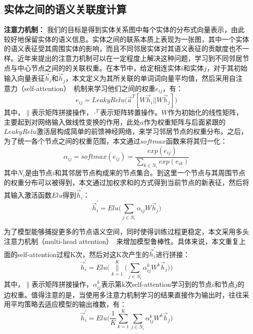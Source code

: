 \subsection{实体之间的语义关联度计算}

\textbf{注意力机制：}
我们的目标是得到实体关系图中每个实体的分布式向量表示，由此较好地保留实体的语义信息。实体之间的联系本质上表现为一张图，其中一个实体的语义表征受其周围实体的影响，而且不同邻居实体对其语义表征的贡献度也不一样。近年来提出的注意力机制可以在一定程度上解决这种问题，学习到不同邻居节点与中心节点之间的的关联权重。在本节中，给定相连实体$i$和实体$j$，对于其初始输入向量表征$\vec h_i$和$\vec h_j$，本文定义为其所关联的单词词向量平均值，然后采用自注意力（self-attention）~\cite{corr/VaswaniSPUJGKP17, iclr/VelickovicCCRLB18}机制来学习他们之间的权重$e_{ij}$，有：
\begin{equation}
    e_{ij} = LeakyRelu\big(\vec a^T[W\vec h_i || W\vec h_j]\big)
    \label{gat_e_ij}
\end{equation}
\noindent 其中，$\parallel$表示矩阵拼接操作，$\cdot^T$表示矩阵转置操作。$W$作为初始化的线性矩阵，主要起到对网络输入做线性变换的作用，此处$a$作为权重矩阵与后面紧跟的$LeakyRelu$激活层构成简单的前馈神经网络，来学习邻居节点的权重分布。之后，为了统一各个节点之间的权重范围，本文通过$softmax$函数来将其归一化：
\begin{equation}
    \alpha_{ij} = softmax(e_{ij}) = \frac{exp(e_{ij})}{\sum_{k\in N_i}exp(e_{ik})}
    \label{alpha_ij}
\end{equation}
\noindent 其中$N_i$是由节点$i$和其邻居节点构成来的节点集合。到这里一个节点与其周围节点的权重分布可以被得到，本文通过加权求和的方式得到当前节点的新表征，然后将其输入激活函数$Elu$得到$\vec h_i^{'}$：
\begin{equation}
    \vec h_i^{'} = Elu\Bigg(\sum_{j \in N_i}{\alpha_{ij} W\vec h_j}\Bigg)
    \label{h_i_t}
\end{equation}

为了模型能够捕捉更多的节点语义空间，同时使得训练过程更稳定，本文采用多头注意力机制（multi-head attention）~\cite{corr/VaswaniSPUJGKP17}来增加模型鲁棒性。具体来说，本文重复上面的self-attention过程K次，然后对这K次产生的$\vec h_i^{'}$进行拼接：
\begin{equation}
    \vec h_i^{'} = Elu\Bigg(\mathop{\parallel}\limits_{k=1}^{K} \Bigg(\sum_{j \in N_i}{\alpha_{ij}^{k} W^k\vec h_j}\Bigg)\Bigg)
    \label{k_heads_1}
\end{equation}
\noindent 其中，$\parallel$表示矩阵拼接操作，$\alpha_{ij}^{k}$表示第k次self-attention学习到的节点$i$和节点$j$的边权重。值得注意的是，当使用多注意力机制学习的结果直接作为输出时，往往采用平均策略去适应模型的输出维数，有：
\begin{equation}
    \vec h_i^{'} = Elu\Bigg(\frac{1}{K}\sum_{k=1}^{K}\sum_{j \in N_i}{\alpha_{ij}^{k} W^k\vec h_j}\Bigg)
    \label{k_heads_2}
\end{equation}


